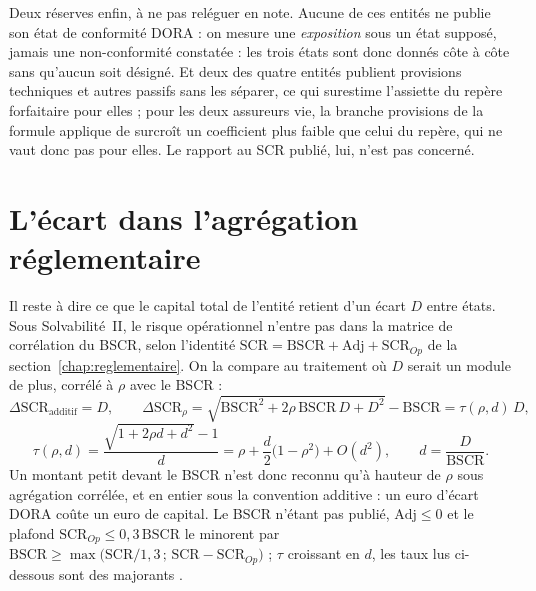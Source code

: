 Deux réserves enfin, à ne pas reléguer en note. Aucune de ces entités ne publie son état de
conformité DORA : on mesure une \emph{exposition} sous un état supposé, jamais une
non-conformité constatée : les trois états sont donc donnés côte à côte sans qu'aucun
soit désigné. Et deux des quatre entités publient \og provisions techniques et autres passifs\fg{}
sans les séparer, ce qui surestime l'assiette du repère forfaitaire pour elles ; pour les deux
assureurs vie, la branche provisions de la formule applique de surcroît un coefficient plus faible
que celui du repère, qui ne vaut donc pas pour elles. Le rapport au SCR publié, lui,
n'est pas concerné.


\section{L'écart dans l'agrégation réglementaire}

Il reste à dire ce que le capital total de l'entité retient d'un écart $D$ entre états. Sous
Solvabilité~II, le risque opérationnel n'entre pas dans la matrice de corrélation du BSCR, selon
l'identité $\mathrm{SCR} = \mathrm{BSCR} + \mathrm{Adj} + \mathrm{SCR}_{Op}$ de la
section~\ref{chap:reglementaire}. On la compare au traitement où $D$ serait un module de plus,
corrélé à $\rho$ avec le BSCR :
\begin{equation}%
\Delta\mathrm{SCR}_{\text{additif}} = D,\qquad
\Delta\mathrm{SCR}_{\rho}=\sqrt{\mathrm{BSCR}^2+2\rho\,\mathrm{BSCR}\,D+D^2}-\mathrm{BSCR}
=\tau(\rho,d)\,D,
\end{equation}
\begin{equation}%
\tau(\rho,d)=\frac{\sqrt{1+2\rho d+d^2}-1}{d}
=\rho+\frac{d}{2}\bigl(1-\rho^2\bigr)+O(d^2),\qquad d=\frac{D}{\mathrm{BSCR}} .
\end{equation}
Un montant petit devant le BSCR n'est donc reconnu qu'à hauteur de $\rho$ sous agrégation
corrélée, et en entier sous la convention additive : un euro d'écart DORA coûte un euro de
capital. Le BSCR n'étant pas publié, $\mathrm{Adj}\le 0$ et le plafond
$\mathrm{SCR}_{Op}\le 0{,}3\,\mathrm{BSCR}$ le minorent par
$\mathrm{BSCR}\ge\max\bigl(\mathrm{SCR}/1{,}3\,;\,\mathrm{SCR}-\mathrm{SCR}_{Op}\bigr)$ ;
$\tau$ croissant en $d$, les taux lus ci-dessous sont des majorants \matcomp.

